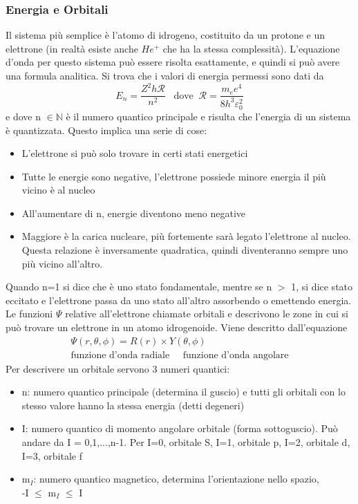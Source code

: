 \documentclass[a4paper]{article}
\begin{document}
\subsubsection{Energia e Orbitali}
Il sistema più semplice è l'atomo di idrogeno, costituito da un protone e un elettrone (in realtà esiste anche $He^+$ che ha la stessa complessità). L'equazione d'onda per questo sistema può essere risolta esattamente, e quindi si può avere una formula analitica. Si trova che i valori di energia permessi sono dati da 
\begin{equation*}
    E_n = \frac{Z^2h \mathcal{R}}{n^2} \; \; \; \text{dove} \; \; \mathcal{R} = \frac{m_e e^4}{8h^3 \varepsilon_0^2}
\end{equation*} 
e dove n $\in \mathbb{N}$ è il numero quantico principale e risulta che l'energia di un sistema è quantizzata. Questo implica una serie di cose:
\begin{itemize}
    \item L'elettrone si può solo trovare in certi stati energetici
    \item Tutte le energie sono negative, l'elettrone possiede minore energia il più vicino è al nucleo
    \item All'aumentare di n, energie diventono meno negative
    \item Maggiore è la carica nucleare, più fortemente sarà legato l'elettrone al nucleo. Questa relazione è inversamente quadratica, quindi diventeranno sempre uno più vicino all'altro. 
\end{itemize}
Quando n=1 si dice che è uno stato fondamentale, mentre se n $>$ 1, si dice stato eccitato e l'elettrone passa da uno stato all'altro assorbendo o emettendo energia. Le funzioni $\Psi$ relative all'elettrone chiamate orbitali e descrivono le zone in cui si può trovare un elettrone in un atomo idrogenoide. Viene descritto dall'equazione 
\begin{gather*}
    \Psi(r,\theta,\phi) = R(r) \times Y(\theta, \phi) \\
    \text{funzione d'onda radiale} \; \; \; \; \; \text{funzione d'onda angolare}
\end{gather*}
Per descrivere un orbitale servono 3 numeri quantici: 
\begin{itemize}
    \item n: numero quantico principale (determina il guscio) e tutti gli orbitali con lo stesso valore hanno la stessa energia (detti degeneri)
    \item I: numero quantico di momento angolare orbitale (forma sottoguscio). Può andare da I = 0,1,...,n-1. Per I=0, orbitale S, I=1, orbitale p, I=2, orbitale d, I=3, orbitale f
    \item m$_I$: numero quantico magnetico, determina l'orientazione nello spazio, \\-I $\leq$ m$_I$ $\leq$ I
\end{itemize}
\end{document}

